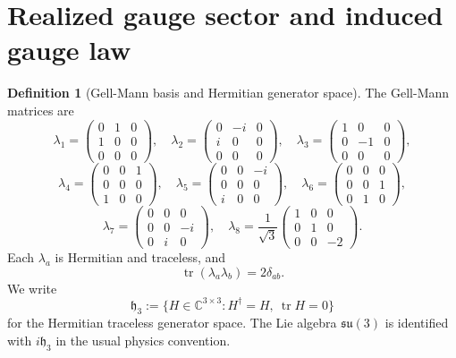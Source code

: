 \documentclass[11pt]{article}
\theoremstyle{definition}
\newtheorem{definition}[theorem]{Definition}
\theoremstyle{remark}
\newcommand{\C}{\mathbb C}
\newcommand{\tr}{\operatorname{tr}}
\newcommand{\fraksu}{\mathfrak{su}(3)}
\newcommand{\mathfrakh}{\mathfrak h_3}
\begin{document}
\section{Realized gauge sector and induced gauge law}

\begin{definition}[Gell-Mann basis and Hermitian generator space]
\label{def:gellmann}
The Gell-Mann matrices are
\[
\lambda_1=\begin{pmatrix}0&1&0\\1&0&0\\0&0&0\end{pmatrix},\quad
\lambda_2=\begin{pmatrix}0&-i&0\\ i&0&0\\0&0&0\end{pmatrix},\quad
\lambda_3=\begin{pmatrix}1&0&0\\0&-1&0\\0&0&0\end{pmatrix},
\]
\[
\lambda_4=\begin{pmatrix}0&0&1\\0&0&0\\1&0&0\end{pmatrix},\quad
\lambda_5=\begin{pmatrix}0&0&-i\\0&0&0\\ i&0&0\end{pmatrix},\quad
\lambda_6=\begin{pmatrix}0&0&0\\0&0&1\\0&1&0\end{pmatrix},
\]
\[
\lambda_7=\begin{pmatrix}0&0&0\\0&0&-i\\0&i&0\end{pmatrix},\quad
\lambda_8=\frac{1}{\sqrt3}
\begin{pmatrix}1&0&0\\0&1&0\\0&0&-2\end{pmatrix}.
\]
Each $\lambda_a$ is Hermitian and traceless, and
\[
\tr(\lambda_a\lambda_b)=2\delta_{ab}.
\]
We write
\[
\mathfrakh
:=
\{H\in\C^{3\times3}:H^\dagger=H,\ \tr H=0\}
\]
for the Hermitian traceless generator space.
The Lie algebra $\fraksu$ is identified with $i\mathfrakh$ in the usual
physics convention.
\end{definition}
\end{document}
